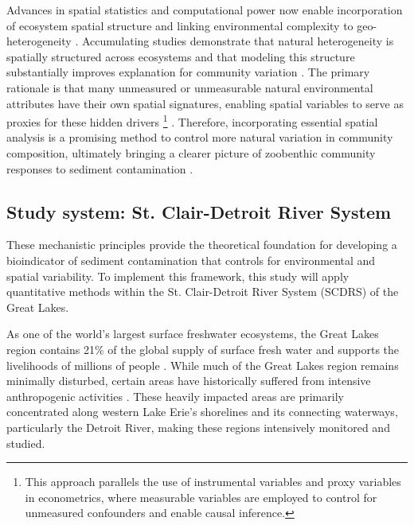 Advances in spatial statistics and computational power now enable incorporation of ecosystem spatial structure 
and linking environmental complexity to geo-heterogeneity \cite{Borcard2002PCNM,Harris2011GWPCA}.
Accumulating studies demonstrate that natural heterogeneity is spatially structured
across ecosystems and that modeling this structure substantially improves explanation for community variation \cite{Turner1989PatternProcess,Borcard1992SpatialPartialling,Borcard2002PCNM}.
The primary rationale is that many unmeasured or unmeasurable natural environmental attributes have their own spatial signatures,
enabling spatial variables to serve as proxies for these hidden drivers \footnote{
This approach parallels the use of instrumental variables and proxy variables in econometrics, 
where measurable variables are employed to control for unmeasured confounders and enable causal inference. 
} \cite{Dormann2007SpatialAutocorrelation,Turner1989PatternProcess}.
Therefore, incorporating essential spatial analysis is a promising method to
control more natural variation in community composition,
ultimately bringing a clearer picture of zoobenthic community responses
to sediment contamination \cite{Legendre2008VariationPartitioning}.

\subsection{Study system: St. Clair-Detroit River System}

These mechanistic principles provide the theoretical foundation for developing a
bioindicator of sediment contamination that controls for environmental and spatial variability.
To implement this framework, this study will apply quantitative methods
within the St. Clair-Detroit River System (SCDRS) of the Great Lakes.

As one of the world's largest surface freshwater ecosystems, 
the Great Lakes region contains 21\% of the global supply of surface fresh water 
and supports the livelihoods of millions of people \cite{EPA_Greatlakes2024}.
While much of the Great Lakes region remains minimally disturbed,
certain areas have historically suffered from intensive anthropogenic activities \cite{EPA_SOGL2007}.
These heavily impacted areas are primarily concentrated along western Lake Erie's shorelines and its connecting waterways,
particularly the Detroit River\cite{EPA_SOGL2007, Drouillard2006, Ciborowski1988}, making these regions intensively monitored and studied.

